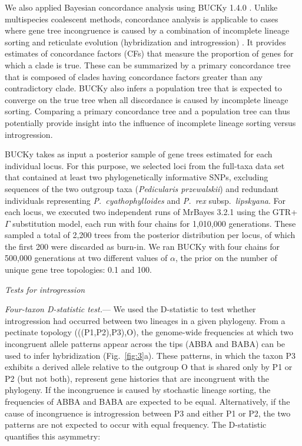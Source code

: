 \documentclass[12pt,letterpaper]{article}
\renewcommand{\subsection}[1]{%
\bigskip
\begin{center}
\begin{large}
\normalfont\itshape #1
\end{large}
\end{center}}
\renewcommand{\subsubsection}[1]{%
\vspace{2ex}
\noindent
\textit{#1.}---}
\begin{document}
We also applied Bayesian concordance analysis
\citep{baum_concordance_2007} using BUCKy 1.4.0
\citep{larget_bucky:_2010}. Unlike multispecies coalescent methods,
concordance analysis is applicable to cases where gene tree
incongruence is caused by a combination of incomplete lineage sorting
and reticulate evolution (hybridization and introgression)
\citep{baum_concordance_2007,ane_bayesian_2007}. It provides estimates
of concordance factors (CFs) that measure the proportion of genes for
which a clade is true. These can be summarized by a primary
concordance tree that is composed of clades having concordance factors
greater than any contradictory clade. BUCKy also infers a population
tree that is expected to converge on the true tree when all
discordance is caused by incomplete lineage sorting. Comparing a
primary concordance tree and a population tree can thus potentially
provide insight into the influence of incomplete lineage sorting
versus introgression.

BUCKy takes as input a posterior sample of gene trees estimated for
each individual locus. For this purpose, we selected loci from the
full-taxa data set that contained at least two phylogenetically
informative SNPs, excluding sequences of the two outgroup taxa
(\emph{Pedicularis przewalskii}) and redundant individuals
representing \emph{P.\ cyathophylloides} and \emph{P.~rex} subsp.\
\emph{lipskyana}.
For each locus, we executed two independent runs of MrBayes 3.2.1
\citep{ronquist_mrbayes_2012} using the GTR+$\Gamma$ substitution
model, each run with four chains for 1,010,000 generations. These
sampled a total of 2,200 trees from the posterior distribution per
locus, of which the first 200 were discarded as burn-in. We ran BUCKy
with four chains for 500,000 generations at two different values of
$\alpha$, the prior on the number of unique gene tree topologies: 0.1
and 100. 

\subsection{Tests for introgression}

\subsubsection{Four-taxon D-statistic test}
We used the D-statistic \citep{green_draft_2010,durand_testing_2011}
to test whether introgression had occurred between two lineages in a
given phylogeny. From a pectinate topology (((P1,P2),P3),O), the
genome-wide frequencies at which two incongruent allele patterns
appear across the tips (ABBA and BABA) can be used to infer
hybridization (Fig.~\ref{fig:3}a). These patterns, in which the taxon
P3 exhibits a derived allele relative to the outgroup O that is shared
only by P1 or P2 (but not both), represent gene histories that are
incongruent with the phylogeny.  If the incongruence is caused by
stochastic lineage sorting, the frequencies of ABBA and BABA are
expected to be equal.  Alternatively, if the cause of incongruence is
introgression between P3 and either P1 or P2, the two patterns are not
expected to occur with equal frequency. The D-statistic quantifies
this asymmetry:
\end{document}
